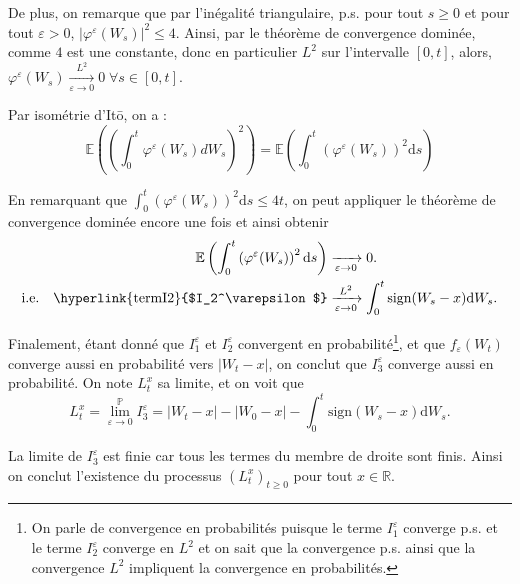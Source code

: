 \documentclass[openany]{book}
\makeatletter
\renewcommand{\P}{\mathds{P}}
\newcommand{\R}{\mathbb{R}}
\newcommand{\E}{\mathbb{E}}
\newcommand{\1}{\mathbbm{1}}
\newcommand{\sign}{\text{sign}}
\renewcommand{\d}{\mathrm{d}}
\renewenvironment{proof}[1][\textbf{\textit{Démonstration}}]{%
  \par\pushQED{\qed}%
  \normalfont\topsep6\p@\@plus6\p@\relax
  \trivlist\item[\hskip\labelsep
    #1\@addpunct{.}]\ignorespaces
}{%
  \popQED\endtrivlist\@endpefalse
}
\theoremstyle{thmfont}
\theoremstyle{deffont}
\theoremstyle{thmfont}
\theoremstyle{deffont}
\makeatother
\begin{document}
\begin{proof}
\noindent De plus, on remarque que par l'inégalité triangulaire, p.s. pour tout $s \geq 0$ et pour tout $\varepsilon > 0$, 
$|\varphi^\varepsilon(W_s)|^2 \leq 4$. Ainsi, par le théorème de convergence dominée, comme $4$ est une constante, donc en particulier $L^2$ sur l'intervalle $[0,t]$, alors, $\varphi^\varepsilon(W_s) \xrightarrow[\varepsilon \to 0]{L^2} 0\;\forall s \in [0,t]$.

\noindent Par isométrie d'Itō, on a :
$$\E\left(\left(\int_0^t \varphi^\varepsilon(W_s) dW_s\right)^2\right) = \E\left(\int_0^t\left(\varphi^\varepsilon(W_s)\right)^2\d s\right)$$

\noindent En remarquant que $\int_0^t \left(\varphi^\varepsilon(W_s)\right)^2\d s \leq 4t$, on peut appliquer le théorème de convergence dominée encore une fois et ainsi obtenir
\begin{align*}
  \E\left(\int_0^t\left(\varphi^\varepsilon(W_s)\right)^2\d s\right) &\xrightarrow[\varepsilon\to0]{} 0.\\
  \text{i.e.}\quad\text{\hyperlink{termI2}{$I_2^\varepsilon$}} &\xrightarrow[\varepsilon\to0]{L^2} \int_0^t \sign(W_s - x) \d W_s.
\end{align*}


\noindent Finalement, étant donné que $I_1^\varepsilon$ et $I_2^\varepsilon$ convergent en probabilité\footnote{On parle de convergence en probabilités puisque le terme \hyperlink{termI1}{$I_1^\varepsilon$} converge p.s. et le terme \hyperlink{termI2}{$I_2^\varepsilon$} converge en $L^2$ et on sait que la convergence p.s. ainsi que la convergence $L^2$ impliquent la convergence en probabilités.}, et que $f_\varepsilon(W_t)$ converge aussi en probabilité vers $|W_t - x|$, on conclut que $I_3^\varepsilon$ converge aussi en probabilité. On note $L_t^x$ sa limite, et on voit que
\begin{equation}
  L_t^x = \lim_{\varepsilon \to 0}^{\P}I_3^\varepsilon = |W_t-x| - |W_0 - x| -  \int_0^t\sign(W_s -x)\d W_s.
  \label{eq:exprTempsLoc}
\end{equation}

\noindent La limite de \hyperlink{termI3}{$I_3^\varepsilon$} est finie car tous les termes du membre de droite sont finis. Ainsi on conclut l'existence du processus $(L_t^x)_{t\geq0}$ pour tout $x \in \R$.


\end{proof}
\end{document}
